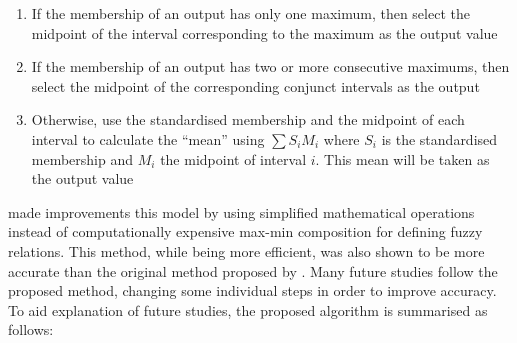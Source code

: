 \documentclass{article}
\theoremstyle{definition}
\begin{document}
\begin{enumerate}
 \item If the membership of an output has only one maximum, then select the midpoint of the interval corresponding to the maximum as the output value
 \item If the membership of an output has two or more consecutive maximums, then select the midpoint of the corresponding conjunct intervals as the output
 \item Otherwise, use the standardised membership and the midpoint of each interval to calculate the ``mean'' using $\sum S_i M_i$ where $S_i$ is the standardised membership and $M_i$ the midpoint of interval $i$. This mean will be taken as the output value
\end{enumerate} 
 
\cite{chen1996forecasting} made improvements this model by using simplified mathematical operations instead of computationally expensive max-min composition for defining fuzzy relations. This method, while being more efficient, was also shown to be more accurate than the original method proposed by \cite{song1993forecasting}. Many future studies follow the proposed method, changing some individual steps in order to improve accuracy. To aid explanation of future studies, the proposed algorithm is summarised as follows:
\end{document}
